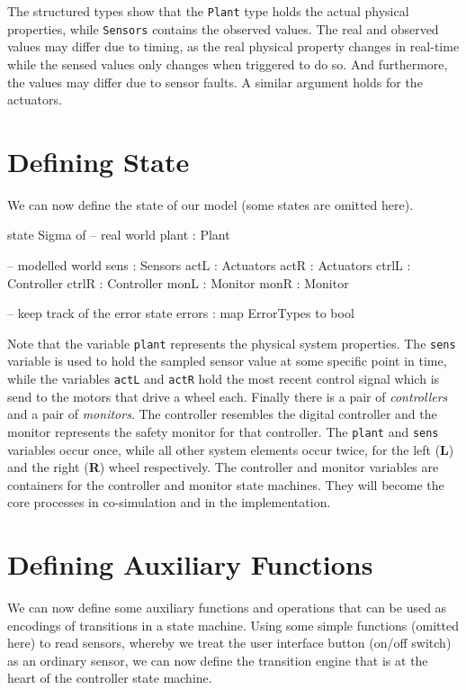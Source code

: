 The structured types show that the \texttt{Plant} type holds the
actual physical properties, while \texttt{Sensors} contains the
observed values. The real and observed values may differ due to
timing, as the real physical property changes in real-time while the
sensed values only changes when triggered to do so. And furthermore,
the values may differ due to sensor faults. A similar argument holds
for the actuators.

\section{Defining State}
We can now define the state of our model (some states are omitted
here).

\begin{vdm_al}
state Sigma of
	-- real world
	plant  : Plant

	-- modelled world
	sens  : Sensors
	actL  : Actuators
	actR  : Actuators
	ctrlL : Controller
	ctrlR : Controller
	monL  : Monitor
	monR  : Monitor

	-- keep track of the error state
	errors : map ErrorTypes to bool
\end{vdm_al}

Note that the variable \texttt{plant} represents the physical system
properties.  The \texttt{sens} variable is used to hold the sampled
sensor value at some specific point in time, while the variables
\texttt{actL} and \texttt{actR} hold the most recent control signal
which is send to the motors that drive a wheel each.  Finally there is
a pair of \textit{controllers} and a pair of \textit{monitors}.  The
controller resembles the digital controller and the monitor represents
the safety monitor for that controller. The \texttt{plant} and
\texttt{sens} variables occur once, while all other system elements
occur twice, for the left (\textbf{L}) and the right (\textbf{R})
wheel respectively. The controller and monitor variables are
containers for the controller and monitor state machines. They will
become the core processes in co-simulation and in the implementation.

\section{Defining Auxiliary Functions}
We can now define some auxiliary functions and operations that can be
used as encodings of transitions in a state machine.  Using some
simple functions (omitted here) to read sensors, whereby we treat the
user interface button (on/off switch) as an ordinary sensor, we can
now define the transition engine that is at the heart of the
controller state machine.

